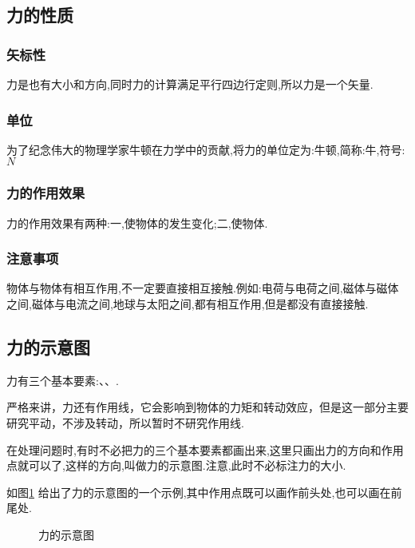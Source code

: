\subsection{力的性质}
\subsubsection{矢标性}
力是也有大小和方向,同时力的计算满足平行四边行定则,所以力是一个矢量.
\subsubsection{单位}
为了纪念伟大的物理学家牛顿在力学中的贡献,将力的单位定为:牛顿,简称:牛,符号:$N$
\subsubsection{力的作用效果}
力的作用效果有两种:一,使物体的发生变化;二,使物体.
\subsubsection{注意事项}
物体与物体有相互作用,不一定要直接相互接触.例如:电荷与电荷之间,磁体与磁体之间,磁体与电流之间,地球与太阳之间,都有相互作用,但是都没有直接接触.

\subsection{力的示意图}
力有三个基本要素:、、.

严格来讲，力还有作用线，它会影响到物体的力矩和转动效应，但是这一部分主要研究平动，不涉及转动，所以暂时不研究作用线.

在处理问题时,有时不必把力的三个基本要素都画出来,这里只画出力的方向和作用点就可以了,这样的方向,叫做力的示意图.注意,此时不必标注力的大小.

如图\ref{fig:shiyitu} 给出了力的示意图的一个示例,其中作用点既可以画作前头处,也可以画在前尾处.
\begin{figure}[H]
  \centering
  \caption{力的示意图}
  \label{fig:shiyitu}
\end{figure}
